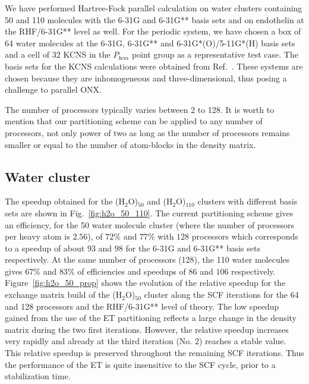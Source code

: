 \documentclass[prl,twocolumn,showpacs,twocolumngrid,superbib]{revtex4}
\begin{document}
 We have performed Hartree-Fock parallel calculation on 
 water clusters containing 50 and 110 molecules with 
 the 6-31G and 6-31G** basis sets and on endothelin at the RHF/6-31G** level as well.
 For the periodic system, we have chosen a box of 64 water molecules
 at the 6-31G, 6-31G** and 6-31G*(O)/5-11G*(H) basis sets
 and a cell of 32 KCNS in the $P_{bcm}$ point group as a representative 
 test case. The basis sets for the KCNS calculations were obtained from 
 Ref.~\cite{CrystalLib}.
 These systems are chosen because
 they are inhomogeneous and three-dimensional, thus posing a challenge
 to parallel ONX.

 The number of processors typically varies between 2 to 128. 
 It is worth to mention that our partitioning scheme can be 
 applied to any number of processors, not only power of two 
 as long as the number of processors remains smaller or equal 
 to the number of atom-blocks in the density matrix.

\subsection{Water cluster}

 The speedup obtained for the (H$_2$O)$_{50}$ 
 and (H$_2$O)$_{110}$ clusters 
 with different basis sets are shown in Fig.~\ref{fig:h2o_50_110}. 
 The current partitioning scheme
 gives an efficiency, for the 50 water molecule cluster 
 (where the number of processors per heavy atom is $2.56$), 
 of $72\%$ and $77\%$ with $128$ processors which 
 corresponds to a speedup of about $93$ and $98$ for 
 the 6-31G and 6-31G** basis sets respectively.  
 At the same number of processors (128), the 110 water molecules gives 
 $67\%$ and $83\%$ of efficiencies and speedups of $86$ and $106$ respectively.
 Figure~\ref{fig:h2o_50_prop} shows the evolution of the relative speedup for
 the exchange matrix build of
 the (H$_2$O)$_{50}$ cluster along the SCF iterations for 
 the 64 and 128 processors and the RHF/6-31G** level of theory. 
 The low speedup gained from the use of the ET partitioning  
 reflects a large change in the density matrix during the two first 
 iterations. However, the relative speedup increases very 
 rapidly and already at the third iteration (No. 2) reaches a stable value.
 This relative speedup is preserved throughout the remaining SCF iterations.
 Thus the performance of the ET is quite insensitive to the SCF cycle, prior to
 a stabilization time.
\end{document}

